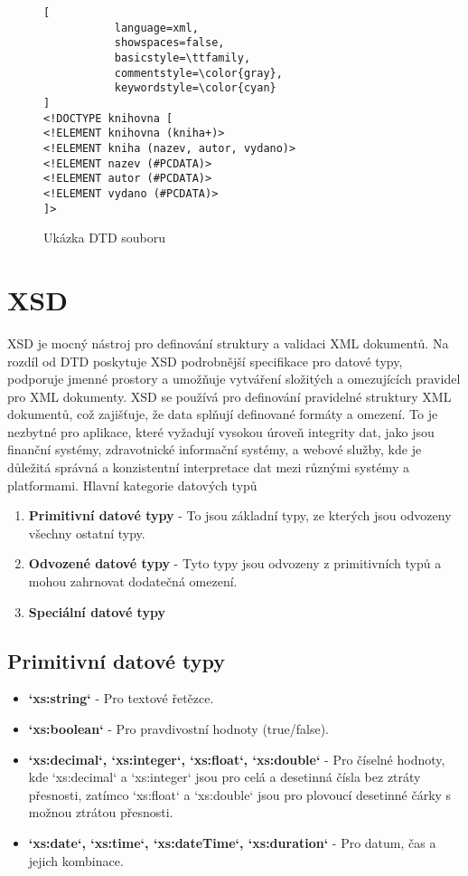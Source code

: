 \begin{figure}[H]
\centering
\begin{lstlisting}[
           language=xml,
           showspaces=false,
           basicstyle=\ttfamily,
           commentstyle=\color{gray},
           keywordstyle=\color{cyan}
]
<!DOCTYPE knihovna [
<!ELEMENT knihovna (kniha+)>
<!ELEMENT kniha (nazev, autor, vydano)>
<!ELEMENT nazev (#PCDATA)>
<!ELEMENT autor (#PCDATA)>
<!ELEMENT vydano (#PCDATA)>
]>

\end{lstlisting}
\caption{Ukázka DTD souboru}
\label{fig:dtd_file}
\end{figure}

\section{XSD}
\label{sec:XSD}
XSD je mocný nástroj pro definování struktury a validaci XML dokumentů. Na rozdíl od DTD poskytuje XSD podrobnější specifikace pro datové typy, podporuje jmenné prostory a umožňuje vytváření složitých a omezujících pravidel pro XML dokumenty.
XSD se používá pro definování pravidelné struktury XML dokumentů, což zajišťuje, že data splňují definované formáty a omezení. To je nezbytné pro aplikace, které vyžadují vysokou úroveň integrity dat, jako jsou finanční systémy, zdravotnické informační systémy, a webové služby, kde je důležitá správná a konzistentní interpretace dat mezi různými systémy a platformami.
Hlavní kategorie datových typů
\begin{enumerate}
    \item \textbf{Primitivní datové typy} - To jsou základní typy, ze kterých jsou odvozeny všechny ostatní typy.
    \item \textbf{Odvozené datové typy} - Tyto typy jsou odvozeny z primitivních typů a mohou zahrnovat dodatečná omezení.
    \item \textbf{Speciální datové typy}
\end{enumerate}
\subsection{Primitivní datové typy}
\begin{itemize}
    \item \textbf{`xs:string`} - Pro textové řetězce.
    \item \textbf{`xs:boolean`} - Pro pravdivostní hodnoty (true/false).
    \item \textbf{`xs:decimal`, `xs:integer`, `xs:float`, `xs:double`} - Pro číselné hodnoty, kde `xs:decimal` a `xs:integer` jsou pro celá a desetinná čísla bez ztráty přesnosti, zatímco `xs:float` a `xs:double` jsou pro plovoucí desetinné čárky s možnou ztrátou přesnosti.
    \item \textbf{`xs:date`, `xs:time`, `xs:dateTime`, `xs:duration`} - Pro datum, čas a jejich kombinace.
\end{itemize}


